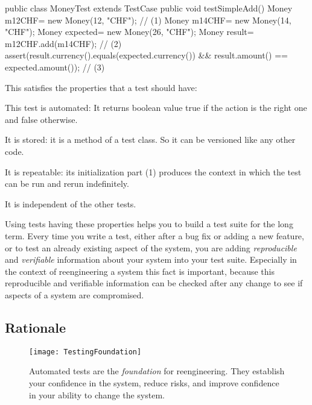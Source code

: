 \documentclass[a4paper,10pt,twoside]{book}
\begin{document}
\begin{code}
public class MoneyTest extends TestCase {
	public void testSimpleAdd() {
		Money m12CHF= new Money(12, "CHF");                 // (1)
		Money m14CHF= new Money(14, "CHF");        
		Money expected= new Money(26, "CHF");
		Money result= m12CHF.add(m14CHF);                     // (2)
		assert(result.currency().equals(expected.currency())
			&& result.amount() == expected.amount());            // (3)
	}
}
\end{code}

This satisfies the properties that a test should have:

\begin{bulletlist}
\item This test is automated: It returns boolean value true if the action is the right one and false otherwise.
\item It is stored: it is a method of a test class. So it can be versioned like any other code.
\item It is repeatable: its initialization part (1) produces the context in which the test can be run and rerun indefinitely. 
\item It is independent of the other tests. 
\end{bulletlist}

Using tests having these properties helps you to build a test suite for the long term. Every time you write a test, either after a bug fix or adding a new feature, or to test an already existing aspect of the system, you are adding \emph{reproducible} and \emph{verifiable} information about your system into your test suite. Especially in the context of reengineering a system this fact is important, because this reproducible and verifiable information can be checked after any change to see if aspects of a system are compromised.

\subsection*{Rationale}

\begin{figure}[h]
\begin{center}
\texttt{[image: TestingFoundation]}
\caption{Automated tests are the \emph{foundation} for reengineering. They establish your confidence in the system, reduce risks, and improve confidence in your ability to change the system. }
\end{center}
\end{figure}
\end{document}
